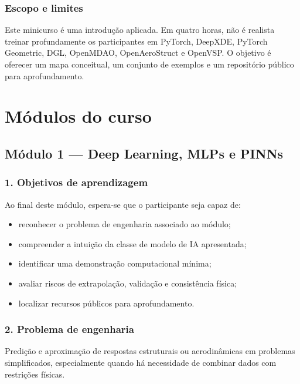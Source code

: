 \documentclass[
  brazilian,
  a4paper,
  DIV=11,
  numbers=noendperiod]{scrreprt}
\providecommand{\tightlist}{%
  \setlength{\itemsep}{0pt}\setlength{\parskip}{0pt}}
\begin{document}
\section{Escopo e limites}\label{escopo-e-limites}

Este minicurso é uma introdução aplicada. Em quatro horas, não é
realista treinar profundamente os participantes em PyTorch, DeepXDE,
PyTorch Geometric, DGL, OpenMDAO, OpenAeroStruct e OpenVSP. O objetivo é
oferecer um mapa conceitual, um conjunto de exemplos e um repositório
público para aprofundamento.

\part{Módulos do curso}

\chapter{Módulo 1 --- Deep Learning, MLPs e
PINNs}\label{muxf3dulo-1-deep-learning-mlps-e-pinns}

\section{1. Objetivos de aprendizagem}\label{objetivos-de-aprendizagem}

Ao final deste módulo, espera-se que o participante seja capaz de:

\begin{itemize}
\tightlist
\item
  reconhecer o problema de engenharia associado ao módulo;
\item
  compreender a intuição da classe de modelo de IA apresentada;
\item
  identificar uma demonstração computacional mínima;
\item
  avaliar riscos de extrapolação, validação e consistência física;
\item
  localizar recursos públicos para aprofundamento.
\end{itemize}

\section{2. Problema de engenharia}\label{problema-de-engenharia}

Predição e aproximação de respostas estruturais ou aerodinâmicas em
problemas simplificados, especialmente quando há necessidade de combinar
dados com restrições físicas.
\end{document}

